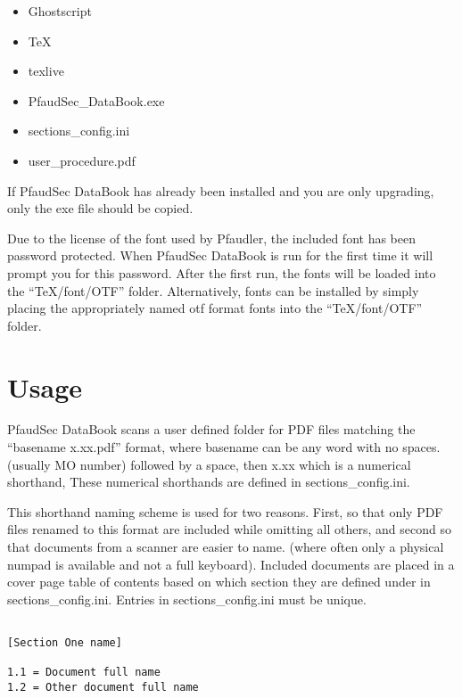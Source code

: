 \documentclass[14pt]{article}
\newcommand{\ifolder}{\item[\faFolderOpen]}
\newcommand{\ifile}{\item[\faFileText]}
\begin{document}
\begin{flushleft}
\begin{enumerate}
\begin{tcolorbox}[boxrule=0.5pt, colback=backgrey, colframe=bordergrey, sharpish corners]
\begin{itemize}[labelsep = 1.5em, align=center]

\ifolder Ghostscript
\ifolder TeX
\ifolder texlive
\ifile PfaudSec\_DataBook.exe
\ifile sections\_config.ini
\ifile user\_procedure.pdf

\end{itemize}
\end{tcolorbox}

If PfaudSec DataBook has already been installed and you are only upgrading, only the exe file should be copied.

Due to the license of the font used by Pfaudler, the included font has been password protected.
When PfaudSec DataBook is run for the first time it will prompt you for this password.
After the first run, the fonts will be loaded into the ``TeX/font/OTF'' folder.
Alternatively, fonts can be installed by simply placing the appropriately named otf format fonts into the ``TeX/font/OTF'' folder.


\end{enumerate}

\section{Usage}
\setlength{\parindent}{0.2in}
PfaudSec DataBook scans a user defined folder for PDF files matching the ``basename x.xx.pdf''
format, where basename can be any word with no spaces. (usually MO number) followed by a space, then x.xx which is a numerical shorthand,
These numerical shorthands are defined in sections\_config.ini.

This shorthand naming scheme is used for two reasons. First, so that only PDF files renamed to this format are included while omitting all others, and second so that documents from a scanner are easier to name.
(where often only a physical numpad is available and not a full keyboard).
Included documents are placed in a cover page table of contents based on which section they are defined under in sections\_config.ini.
Entries in sections\_config.ini must be unique.

\begin{tcolorbox}[
coltitle=black, title=\centering Example sections\_config.ini,
boxrule=0.5pt, colback=backgrey, colframe=bordergrey, sharpish corners] 
\begin{verbatim}

[Section One name]

1.1 = Document full name
1.2 = Other document full name


\end{verbatim}
\end{tcolorbox}
\end{flushleft}
\end{document}
